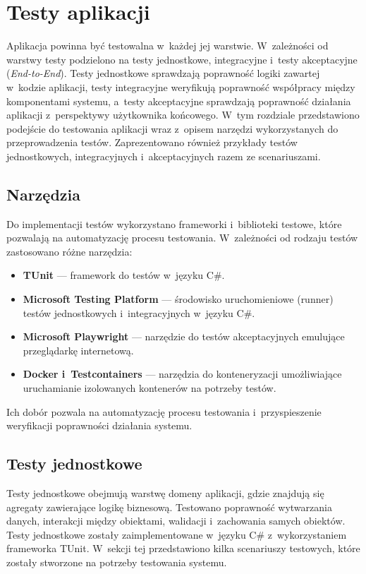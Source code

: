 \chapter{Testy aplikacji}
Aplikacja powinna być testowalna w~każdej jej warstwie. W~zależności od warstwy testy podzielono na testy jednostkowe,
integracyjne i~testy akceptacyjne (\textit{End-to-End}). Testy jednostkowe sprawdzają poprawność logiki zawartej w~kodzie aplikacji,
testy integracyjne weryfikują poprawność współpracy między komponentami systemu, a~testy akceptacyjne sprawdzają
poprawność działania aplikacji z~perspektywy użytkownika końcowego. W~tym rozdziale przedstawiono podejście do testowania aplikacji wraz z~opisem narzędzi wykorzystanych do przeprowadzenia
testów. Zaprezentowano również przykłady testów jednostkowych, integracyjnych i~akceptacyjnych razem ze scenariuszami.

\section{Narzędzia}
Do implementacji testów wykorzystano frameworki i~biblioteki testowe, które pozwalają na automatyzację procesu testowania. W~zależności od rodzaju testów zastosowano różne narzędzia:
\begin{itemize}
\item \textbf{TUnit} --- framework do testów w~języku C\#.
\item \textbf{Microsoft Testing Platform} --- środowisko uruchomieniowe (runner) testów jednostkowych i~integracyjnych w~języku C\#.
\item \textbf{Microsoft Playwright} --- narzędzie do testów akceptacyjnych emulujące przeglądarkę internetową.
\item \textbf{Docker i~Testcontainers} --- narzędzia do konteneryzacji umożliwiające uruchamianie izolowanych kontenerów na potrzeby testów.
\end{itemize}
Ich dobór pozwala na automatyzację procesu testowania i~przyspieszenie weryfikacji poprawności działania systemu.

\section{Testy jednostkowe}
Testy jednostkowe obejmują warstwę domeny aplikacji, gdzie znajdują się agregaty zawierające logikę biznesową.
Testowano poprawność wytwarzania danych, interakcji między obiektami, walidacji i~zachowania samych obiektów.
Testy jednostkowe zostały zaimplementowane w~języku C\# z~wykorzystaniem frameworka TUnit. W~sekcji tej przedstawiono
kilka scenariuszy testowych, które zostały stworzone na potrzeby testowania systemu. 

